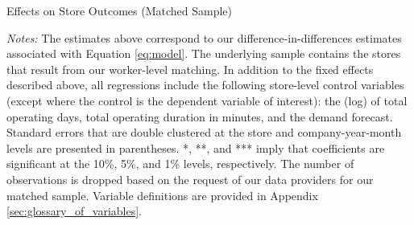 \documentclass[letterpaper,11pt,leqno]{article}
\theoremstyle{paper}
\newcommand{\note}[2][]{\parbox{\textwidth}{\footnotesize\vspace*{10pt}\textit{#1}#2}}
\begin{document}
\begin{singlespace}
\begin{table}[h]
\caption{Effects on Store Outcomes (Matched Sample)}

\note{\scriptsize \textit{Notes: } The estimates above correspond to our difference-in-differences estimates associated with Equation \ref{eq:model}. The underlying sample contains the stores that result from our worker-level matching.
In addition to the fixed effects described above, all regressions include the following store-level control variables (except where the control is the dependent variable of interest): the (log) of total operating days, total operating duration in minutes, and the demand forecast. Standard errors that are double clustered at the store and company-year-month levels are presented in parentheses. *, **, and *** imply that coefficients are significant at the 10\%, 5\%, and 1\% levels, respectively. The number of observations is dropped based on the request of our data providers for our matched sample. Variable definitions are provided in Appendix \ref{sec:glossary_of_variables}.}
\label{table:store_level_matched}
\end{table}
\end{singlespace}
\end{document}
